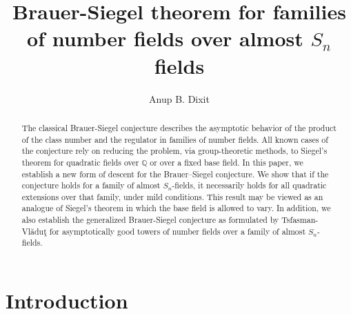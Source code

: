 \documentclass[12pt]{amsart}
\title[Brauer-Siegel theorem for families of number fields over almost $S_n$ fields]{Brauer-Siegel theorem for families of number fields over almost $S_n$ fields}
\author{Anup B. Dixit}
\theoremstyle{definition}
\newcommand{\Q}{\mathbb{Q}}
\begin{document}
\begin{abstract}
    The classical Brauer-Siegel conjecture describes the asymptotic behavior of the product of the class number and the regulator in families of number fields. All known cases of the conjecture rely on reducing the problem, via group-theoretic methods, to Siegel's theorem for quadratic fields over $\mathbb{Q}$ or over a fixed base field. In this paper, we establish a new form of descent for the Brauer–Siegel conjecture. We show that if the conjecture holds for a family of almost $S_n$-fields, it necessarily holds for all quadratic extensions over that family, under mild conditions. This result may be viewed as an analogue of Siegel's theorem in which the base field is allowed to vary. In addition, we also establish the generalized Brauer-Siegel conjecture as formulated by Tsfasman-Vl\u{a}du\c{t} for asymptotically good towers of number fields over a family of almost $S_{n}$-fields.

\end{abstract}

\maketitle

\section{Introduction}
\bigskip

% 
\end{document}
